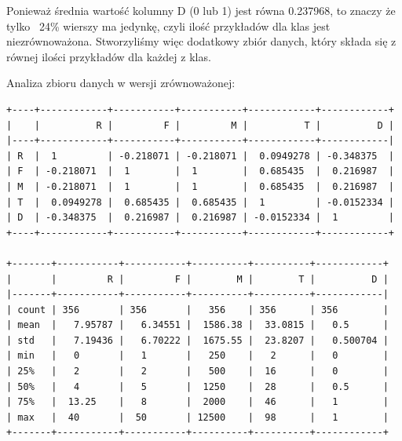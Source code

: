 \documentclass[11pt, a4paper, notitlepage]{report}
\begin{document}
Ponieważ średnia wartość kolumny D (0 lub 1) jest równa 0.237968, to znaczy że tylko ~24\% wierszy ma jedynkę, czyli ilość przykładów dla klas jest niezrównoważona.
Stworzyliśmy więc dodatkowy zbiór danych, który składa się z równej ilości przykładów dla każdej z klas.


Analiza zbioru danych w wersji zrównoważonej:

\begin{verbatim}
+----+------------+-----------+-----------+------------+------------+
|    |          R |         F |         M |          T |          D |
|----+------------+-----------+-----------+------------+------------|
| R  |  1         | -0.218071 | -0.218071 |  0.0949278 | -0.348375  |
| F  | -0.218071  |  1        |  1        |  0.685435  |  0.216987  |
| M  | -0.218071  |  1        |  1        |  0.685435  |  0.216987  |
| T  |  0.0949278 |  0.685435 |  0.685435 |  1         | -0.0152334 |
| D  | -0.348375  |  0.216987 |  0.216987 | -0.0152334 |  1         |
+----+------------+-----------+-----------+------------+------------+

+-------+-----------+-----------+----------+----------+------------+
|       |         R |         F |        M |        T |          D |
|-------+-----------+-----------+----------+----------+------------|
| count | 356       | 356       |   356    | 356      | 356        |
| mean  |   7.95787 |   6.34551 |  1586.38 |  33.0815 |   0.5      |
| std   |   7.19436 |   6.70222 |  1675.55 |  23.8207 |   0.500704 |
| min   |   0       |   1       |   250    |   2      |   0        |
| 25%   |   2       |   2       |   500    |  16      |   0        |
| 50%   |   4       |   5       |  1250    |  28      |   0.5      |
| 75%   |  13.25    |   8       |  2000    |  46      |   1        |
| max   |  40       |  50       | 12500    |  98      |   1        |
+-------+-----------+-----------+----------+----------+------------+
\end{verbatim}
\end{document}
